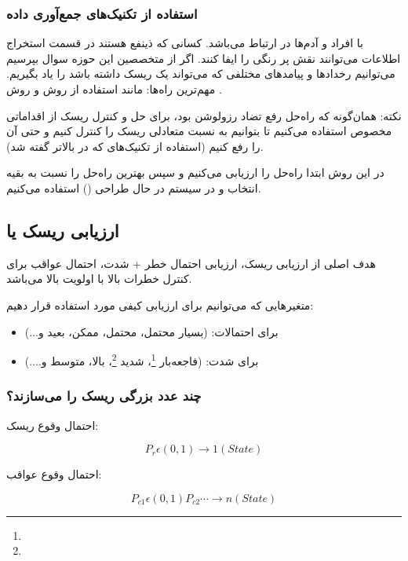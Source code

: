 \subsubsection{استفاده از تکنیک‌های جمع‌آوری داده}

با افراد و آدم‌ها در ارتباط می‌باشد. کسانی که ذینفع هستند در قسمت استخراج
اطلاعات می‌توانند نقش پر رنگی را ایفا کنند. اگر از متخصصین این حوزه سوال بپرسیم
می‌توانیم رخداد‌ها و پیامد‌های مختلفی که می‌تواند یک ریسک داشته باشد را یاد
بگیریم. مهم‌ترین راه‌ها: مانند استفاده از روش  و روش .

نکته: همان‌گونه که راه‌حل رفع تضاد رزولوشن بود، برای حل و کنترل ریسک از اقداماتی
مخصوص استفاده می‌کنیم تا بتوانیم به نسبت متعادلی ریسک را کنترل کنیم و حتی آن را
رفع کنیم (استفاده از تکنیک‌های  که در بالاتر گفته شد).

در این روش ابتدا راه‌حل را ارزیابی می‌کنیم و سپس بهترین راه‌حل را نسبت به بقیه
انتخاب و در سیستم در حال طراحی () استفاده می‌کنیم.

\subsection{ارزیابی ریسک یا }

هدف اصلی از ارزیابی ریسک، ارزیابی احتمال خطر + شدت، احتمال عواقب برای کنترل
خطرات بالا با اولویت بالا می‌باشد.

متغیر‌هایی که می‌توانیم برای ارزیابی کیفی مورد استفاده قرار دهیم:

\begin{itemize}
    \item برای احتمالات: (بسیار محتمل، محتمل، ممکن، بعید و...)
    \item برای شدت: (فاجعه‌بار \footnote{}، شدید
    \footnote{}، بالا، متوسط و....)
\end{itemize}

\subsubsection*{چند عدد بزرگی ریسک را می‌سازند؟}

احتمال وقوع ریسک:

\begin{equation}
    P_{r} \epsilon (0, 1) \rightarrow 1 (State)
\end{equation}

احتمال وقوع عواقب:

\begin{equation}
    P_{c1} \epsilon (0, 1) P_{c2} \cdots \rightarrow n (State)
\end{equation}

